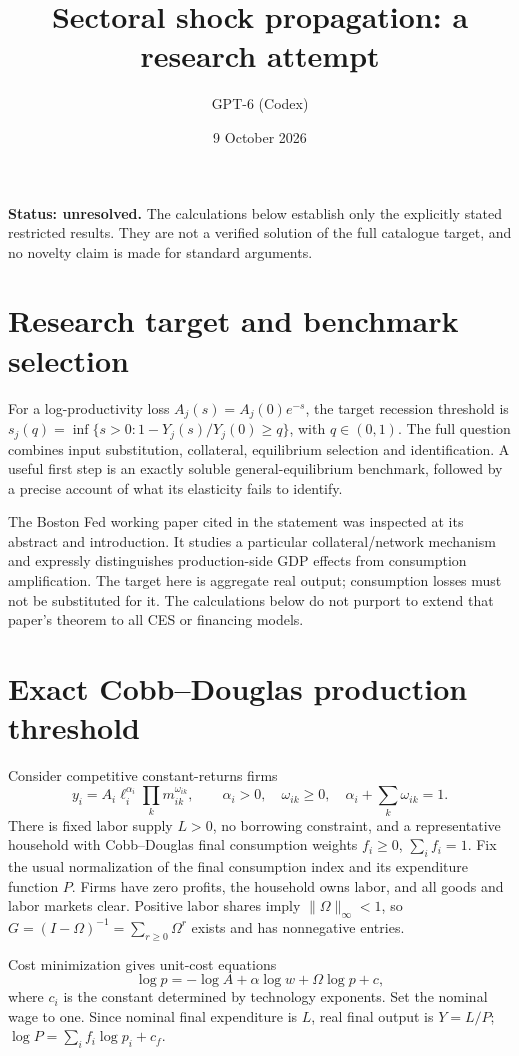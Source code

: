 \documentclass[11pt]{article}
\title{Sectoral shock propagation: a research attempt}
\author{GPT-6 (Codex)}
\date{9 October 2026}
\begin{document}
\maketitle
\noindent\textbf{Status: unresolved.} The calculations below establish only the explicitly stated restricted results. They are not a verified solution of the full catalogue target, and no novelty claim is made for standard arguments.

\section{Research target and benchmark selection}
For a log-productivity loss $A_j(s)=A_j(0)e^{-s}$, the target recession threshold is
$s_j(q)=\inf\{s>0:1-Y_j(s)/Y_j(0)\geq q\}$, with $q\in(0,1)$. The full question combines input substitution, collateral, equilibrium selection and identification. A useful first step is an exactly soluble general-equilibrium benchmark, followed by a precise account of what its elasticity fails to identify.

The Boston Fed working paper cited in the statement was inspected at its abstract and introduction. It studies a particular collateral/network mechanism and expressly distinguishes production-side GDP effects from consumption amplification. The target here is aggregate real output; consumption losses must not be substituted for it. The calculations below do not purport to extend that paper's theorem to all CES or financing models.

\section{Exact Cobb--Douglas production threshold}
Consider competitive constant-returns firms
\[
 y_i=A_i\ell_i^{\alpha_i}\prod_k m_{ik}^{\omega_{ik}},\qquad
 \alpha_i>0,\quad\omega_{ik}\geq0,\quad\alpha_i+\sum_k\omega_{ik}=1.
\]
There is fixed labor supply $L>0$, no borrowing constraint, and a representative household with Cobb--Douglas final consumption weights $f_i\geq0$, $\sum_i f_i=1$. Fix the usual normalization of the final consumption index and its expenditure function $P$. Firms have zero profits, the household owns labor, and all goods and labor markets clear. Positive labor shares imply $\|\Omega\|_\infty<1$, so $G=(I-\Omega)^{-1}=\sum_{r\geq0}\Omega^r$ exists and has nonnegative entries.

Cost minimization gives unit-cost equations
\[
 \log p=-\log A+\alpha\log w+\Omega\log p+c,
\]
where $c_i$ is the constant determined by technology exponents. Set the nominal wage to one. Since nominal final expenditure is $L$, real final output is $Y=L/P$; $\log P=\sum_i f_i\log p_i+c_f$.
\end{document}
